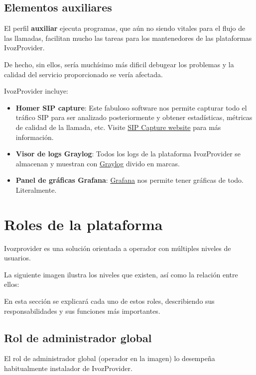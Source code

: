 \documentclass[letterpaper,10pt,spanish]{sphinxmanual}
\begin{document}
\section{Elementos auxiliares}
\label{architecture/index:auxiliar-elements}
El perfil \textbf{auxiliar} ejecuta programas, que aún no siendo vitales para el flujo de las llamadas, facilitan mucho las tareas para los mantenedores de las plataformas IvozProvider.

De hecho, sin ellos, sería muchísimo más dificil debugear los problemas y la calidad del servicio proporcionado se vería afectada.

IvozProvider incluye:
\begin{itemize}
\item {} 
\textbf{Homer SIP capture}: Este fabuloso software nos permite capturar todo el tráfico SIP para ser analizado posteriormente y obtener estadísticas, métricas de calidad de la llamada, etc. Visite \href{http://sipcapture.org/}{SIP Capture website} para más información.

\item {} 
\textbf{Visor de logs Graylog}: Todos los logs de la plataforma IvozProvider se almacenan y muestran con \href{https://www.graylog.org/}{Graylog} divido en marcas.

\item {} 
\textbf{Panel de gráficas Grafana}: \href{http://grafana.org/}{Grafana} nos permite tener gráficas de todo. Literalmente.

\end{itemize}


\chapter{Roles de la plataforma}
\label{operation_roles/index:operation-roles}\label{operation_roles/index::doc}\label{operation_roles/index:platform-roles}
Ivozprovider es una solución orientada a operador con múltiples niveles de usuarios.

La siguiente imagen ilustra los niveles que existen, así como la relación entre ellos:

\noindent{}

En esta sección se explicará cada uno de estos roles, describiendo sus responsabilidades y sus funciones más importantes.


\section{Rol de administrador global}
\label{operation_roles/index:global-administator-role}
El rol de administrador global (operador en la imagen) lo desempeña habitualmente instalador de IvozProvider.
\end{document}
